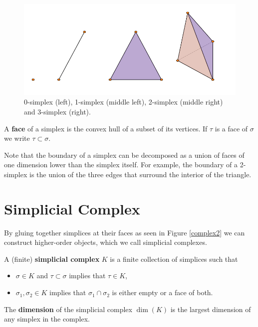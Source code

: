 \begin{figure}
  \centering
  \includegraphics[]{simplex.pdf}
  \caption{
  \label{simplices}
0-simplex (left), 1-simplex (middle left), 2-simplex (middle right) and 3-simplex (right).}
  \end{figure}
\begin{definition}
A \textbf{face} of a simplex is the convex hull of a subset of its vertices. If $\tau$ is a face of $\sigma$ we write $\tau \subset \sigma$.
\end{definition}
%
Note that the boundary of a simplex can be decomposed as a union of faces of one dimension lower than the simplex itself. For example, the boundary of a 2-simplex is the union of the three edges that surround the interior of the triangle.
\section{Simplicial Complex}
By gluing together simplices at their faces as seen in Figure \ref{complex2} we can construct higher-order objects, which we call simplicial complexes.

\begin{definition} \label{defsimcomp}
A (finite) \textbf{simplicial complex} $K$ is a finite collection of simplices such that

\begin{itemize}
    \item $\sigma \in K$ and $\tau \subset \sigma$ implies that $\tau \in K$,
    \item $\sigma_{1}, \sigma_{2} \in K$ implies that $\sigma_{1} \cap \sigma_{2}$ is either empty or a face of both.
\end{itemize}
The \textbf{dimension} of the simplicial complex $\dim(K)$ is the largest dimension of any simplex in the complex.
\end{definition}

